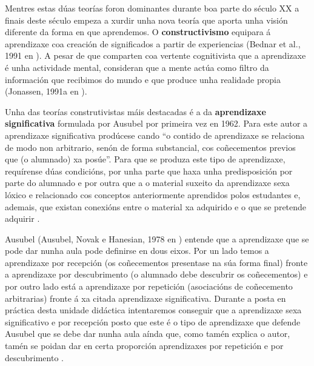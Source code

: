 Mentres estas dúas teorías foron dominantes durante boa parte do século XX a finais deste século empeza a xurdir unha nova teoría que aporta unha visión diferente da forma en que aprendemos. O \textbf{constructivismo} equipara á aprendizaxe coa creación de significados a partir de experiencias (Bednar et al., 1991 en ). A pesar de que comparten coa vertente cognitivista que a aprendizaxe é unha actividade mental, consideran que a mente actúa como filtro da información que recibimos do mundo e que produce unha realidade propia (Jonassen, 1991a en ).

Unha das teorías construtivistas máis destacadas é a da \textbf{aprendizaxe significativa} formulada por Ausubel por primeira vez en 1962. Para este autor a aprendizaxe significativa prodúcese cando ``o contido de aprendizaxe se relaciona de modo non arbitrario, senón de forma substancial, cos coñecementos previos que (o alumnado) xa posúe''\cite[p.~206]{unedpsicoedu}. Para que se produza este tipo de aprendizaxe, requírense dúas condicións, por unha parte que haxa unha predisposición por parte do alumnado e por outra que a o material suxeito da aprendizaxe sexa lóxico e relacionado cos conceptos anteriormente aprendidos polos estudantes e, ademais, que existan conexións entre o material xa adquirido e o que se pretende adquirir \cite{rodriguez2004teoria}.

Ausubel (Ausubel, Novak e Hanesian, 1978 en ) entende que a aprendizaxe que se pode dar nunha aula pode definirse en dous eixos. Por un lado temos a aprendizaxe por recepción (os coñecementos presentase na súa forma final) fronte a aprendizaxe por descubrimento (o alumnado debe descubrir os coñecementos) e por outro lado está a aprendizaxe por repetición (asociacións de coñecemento arbitrarias) fronte á xa citada aprendizaxe significativa. Durante a posta en práctica desta unidade didáctica intentaremos conseguir que a aprendizaxe sexa significativo e por recepción posto que este é o tipo de aprendizaxe que defende Ausubel que se debe dar nunha aula aínda que, como tamén explica o autor, tamén se poidan dar en certa proporción aprendizaxes por repetición e por descubrimento \cite{unedpsicoedu}.
